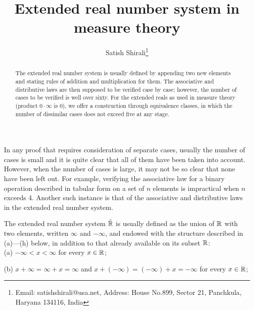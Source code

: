 \documentclass{article}
\begin{document}
\title{Extended real number system in measure theory}

\author{Satish Shirali\thanks{Email: satishshirali@usa.net, Address: House No.899, Sector 21, Panchkula, Haryana 134116, India}}

\date{}

\maketitle
\thispagestyle{empty}


\begin{abstract}
\noindent The extended real number system is usually defined by
appending two new elements and stating rules of addition and
multiplication for them. The associative and distributive laws are
then supposed to be verified case by case; however, the number of
cases to be verified is well over sixty. For the extended reals as
used in measure theory (product $0\cdot\infty$ is 0), we offer a
construction through equivalence classes, in which the number of
dissimilar cases does not exceed five at any
stage.
\end{abstract}





\vspace{1cm}





\noindent In any proof that requires consideration of separate
cases, usually the number of cases is small and it is quite clear
that all of them have been taken into account. However, when the
number of cases is large, it may not be so clear that none have
been left out. For example, verifying the associative law for a
binary operation described in tabular form on a set of $n$
elements is impractical when $n$ exceeds 4. Another such
instance is that of the associative and distributive laws in the
extended real number system.

The extended real number system $\tilde{{\bf {\mathbb R}}}$ is
usually defined as the union of ${\bf {\mathbb R}}$ with two
elements, written $\infty$ and $-\infty $, and endowed with the
structure described in (a)---(h) below, in addition to that
already available on its subset ${\bf {\mathbb R}}$:\\

(a) $-\infty <x<\infty$ for every $x\in\bf {\mathbb R}$;

(b) $x+\infty=\infty +x=\infty$ and $x+(-\infty)=(-\infty)+x=-\infty$ for every $x\in {\bf {\mathbb R}}$;
\end{document}
